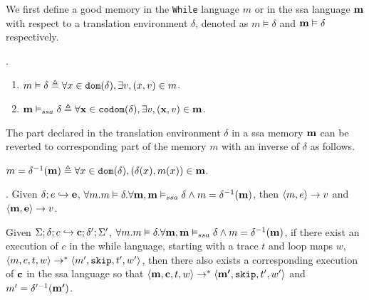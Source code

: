 \documentclass[a4paper,11pt]{article}
\begin{document}
{
We first define a good memory in the {\tt While} language $m$ or in the ssa language $\boldsymbol{\mathbf{m}}$ with respect to a translation environment $\delta$, denoted as $m \vDash \delta$ and $\boldsymbol{\mathbf{m}} \vDash \delta$ respectively. 
%
\begin{defn}.
\begin{enumerate}
    \item $ m \vDash \delta  \triangleq \forall x \in \mathtt{dom}(\delta), \exists v, (x,v) \in m$.
    \item $ \boldsymbol{\mathbf{m}} \vDash_{ssa} \delta  \triangleq \forall \boldsymbol{\mathbf{x}} \in \mathtt{codom}(\delta), \exists v, (\boldsymbol{\mathbf{x}},v) \in \boldsymbol{\mathbf{m}}$.
\end{enumerate}
\end{defn}
%
The part declared in the translation environment $\delta$ in a ssa memory $\boldsymbol{\mathbf{m}}$ can be reverted to corresponding part of the memory $m$ with an inverse of $\delta$ as follows.
%
\begin{defn}
 $m = \delta^{-1}(\boldsymbol{\mathbf{m}}) \triangleq \forall x \in \mathtt{dom}(\delta), (\delta(x), m(x)) \in \boldsymbol{\mathbf{m}} $.
\end{defn}
}
%
\begin{lem}.
\label{lem:same_value}
{
Given $\delta; e \hookrightarrow \boldsymbol{\mathbf{e}}$,  $\forall m. m \vDash \delta. \forall \boldsymbol{\mathbf{m}}, \boldsymbol{\mathbf{m}} \vDash_{ssa} \delta \land m = \delta^{-1}(\boldsymbol{\mathbf{m}})$, then $\langle m, e \rangle \to v $ and $\langle 
\boldsymbol{\mathbf{m}}, \boldsymbol{\mathbf{e}} \rangle \to {v}$.
}
\end{lem}

\begin{thm}
Given $\Sigma; \delta ; c \hookrightarrow \boldsymbol{\mathbf{c}} ; \delta';\Sigma' $, $\forall m. m \vDash \delta. \forall \boldsymbol{\mathbf{m}}, \boldsymbol{\mathbf{m}} \vDash_{ssa} \delta \land m = \delta^{-1}(\boldsymbol{\mathbf{m}})$, if there exist an execution of $c$ in the while language, starting with a trace $t$ and loop maps $w$, $\langle m, c, t, w \rangle \to^{*} \langle m', \mathtt{skip}, t', w'  \rangle $,  then there also exists a corresponding execution of $\boldsymbol{\mathbf{c}}$ in the ssa language so that 
  $\langle   {\boldsymbol{\mathbf{m}}}, \boldsymbol{\mathbf{c}}, t, w \rangle \to^{*} \langle {  \boldsymbol{\mathbf{m'}}}, \mathtt{skip}, t', w'  \rangle $ and $ m' = \delta'^{-1}(\boldsymbol{\mathbf{m'}}) $.
\end{thm}
\end{document}
